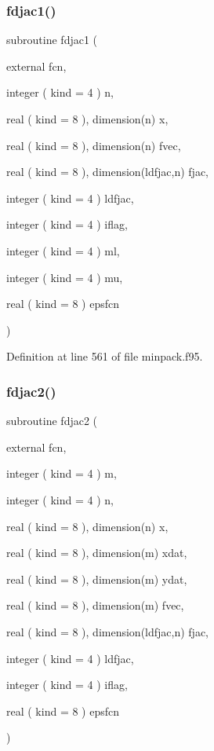 \subsubsection{\texorpdfstring{fdjac1()}{fdjac1()}}
{\footnotesize\ttfamily subroutine fdjac1 (\begin{DoxyParamCaption}\item[{external}]{fcn,  }\item[{integer ( kind = 4 )}]{n,  }\item[{real ( kind = 8 ), dimension(n)}]{x,  }\item[{real ( kind = 8 ), dimension(n)}]{fvec,  }\item[{real ( kind = 8 ), dimension(ldfjac,n)}]{fjac,  }\item[{integer ( kind = 4 )}]{ldfjac,  }\item[{integer ( kind = 4 )}]{iflag,  }\item[{integer ( kind = 4 )}]{ml,  }\item[{integer ( kind = 4 )}]{mu,  }\item[{real ( kind = 8 )}]{epsfcn }\end{DoxyParamCaption})}



Definition at line 561 of file minpack.\+f95.

\mbox{\label{minpack_8f95_a49e6c47697604e26b8f5aae0c4fd9aef}} 
\subsubsection{\texorpdfstring{fdjac2()}{fdjac2()}}
{\footnotesize\ttfamily subroutine fdjac2 (\begin{DoxyParamCaption}\item[{external}]{fcn,  }\item[{integer ( kind = 4 )}]{m,  }\item[{integer ( kind = 4 )}]{n,  }\item[{real ( kind = 8 ), dimension(n)}]{x,  }\item[{real ( kind = 8 ), dimension(m)}]{xdat,  }\item[{real ( kind = 8 ), dimension(m)}]{ydat,  }\item[{real ( kind = 8 ), dimension(m)}]{fvec,  }\item[{real ( kind = 8 ), dimension(ldfjac,n)}]{fjac,  }\item[{integer ( kind = 4 )}]{ldfjac,  }\item[{integer ( kind = 4 )}]{iflag,  }\item[{real ( kind = 8 )}]{epsfcn }\end{DoxyParamCaption})}



